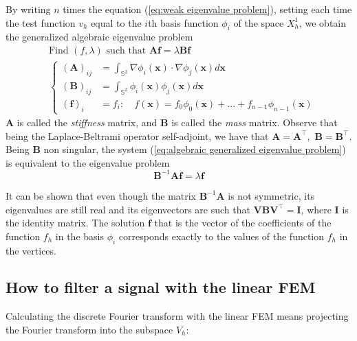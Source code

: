 By writing $n$ times the equation (\ref{eq:weak eigenvalue problem}), setting each time the test function $v_h$ equal to the $i$th basis function $\phi_i$ of the space $X_h^1$, we obtain the generalized algebraic eigenvalue problem
\begin{equation}\label{eq:algebraic generalized eigenvalue problem}
\begin{aligned}
&\text{Find }(f,\lambda)\text{ such that }\mathbf A\mathbf f = \lambda\mathbf  B \mathbf f\\
&\begin{cases}
(\mathbf A)_{ij} &= \int_{\mathbb S^2}\nabla \phi_i(\mathbf{x})\cdot \nabla \phi_j(\mathbf{x})d\mathbf{x}\\
(\mathbf B)_{ij} &= \int_{\mathbb S^2} \phi_i(\mathbf{x}) \phi_j(\mathbf{x})d\mathbf{x}\\
(\mathbf f)_i &= f_i:\quad f(\mathbf x) = f_0\phi_0(\mathbf x)+ ... + f_{n-1}\phi_{n-1}(\mathbf x) 
\end{cases}
\end{aligned}
\end{equation}
$\mathbf A$ is called the \textit{stiffness} matrix, and $\mathbf B$ is called the \textit{mass} matrix. Observe that being the Laplace-Beltrami operator self-adjoint, we have that $\mathbf A=\mathbf A^\intercal,$ $\mathbf B=\mathbf B^\intercal$. Being $\mathbf B$ non singular, the system (\ref{eq:algebraic generalized eigenvalue problem}) is equivalent to the eigenvalue problem
\begin{equation}\label{eq:algebraic  eigenvalue problem}
\mathbf B^{-1}\mathbf A\mathbf f = \lambda \mathbf f
\end{equation}

It can be shown \cite{Strang} that even though the matrix $\mathbf B^{-1}\mathbf A$ is not symmetric, its eigenvalues are still real and its eigenvectors are such that $\mathbf V\mathbf B\mathbf V^\intercal=\mathbf I$, where $\mathbf I$ is the identity matrix. The solution $\mathbf f$ that is the vector of the coefficients of the function $f_h$ in the basis $\phi_i$ corresponds exactly to the values of the function $f_h$ in the vertices. 

\subsection{How to filter a signal with the linear FEM}
Calculating the discrete Fourier transform with the linear FEM means projecting the Fourier transform into the subspace $V_h$:

